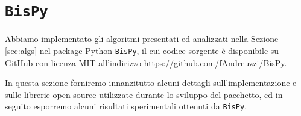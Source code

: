\section{\texttt{BisPy}}
\label{sec:bispy}
Abbiamo implementato gli algoritmi presentati ed analizzati nella Sezione \ref{sec:algs} nel package Python \texttt{BisPy}, il cui codice sorgente è disponibile su GitHub con licenza \href{https://github.com/fAndreuzzi/BisPy/blob/master/LICENSE}{MIT} all'indirizzo \href{https://github.com/fAndreuzzi/BisPy}{https://github.com/fAndreuzzi/BisPy}.

In questa sezione forniremo innanzitutto alcuni dettagli sull'implementazione e sulle librerie open source utilizzate durante lo sviluppo del pacchetto, ed in seguito esporremo alcuni risultati sperimentali ottenuti da \texttt{BisPy}.





